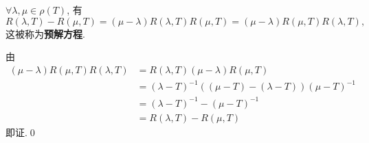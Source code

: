     \begin{Proposition}
        $ \forall \lambda, \mu\in\rho(T) $, 有
        \[
            R(\lambda, T)-R(\mu, T)=(\mu-\lambda)R(\lambda, T)R(\mu, T) = (\mu-\lambda)R(\mu, T)R(\lambda, T),
        \]
        这被称为\textbf{预解方程}.
    \end{Proposition}
    \begin{Proof}
        由
        \[
            \begin{aligned}
                (\mu-\lambda)R(\mu, T)R(\lambda, T) & = R(\lambda, T)(\mu-\lambda)R(\mu, T)\\
                & = (\lambda-T)^{-1}((\mu-T)-(\lambda-T))(\mu-T)^{-1}\\
                & = (\lambda-T)^{-1}-(\mu-T)^{-1}\\
                & = R(\lambda, T)-R(\mu, T)
            \end{aligned}
        \]
        即证.\qed
    \end{Proof}


